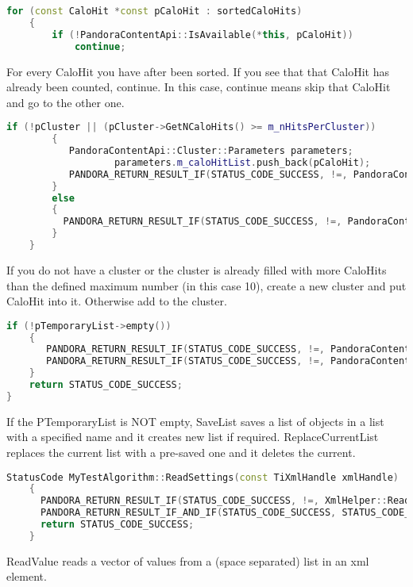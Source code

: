 \begin{lstlisting}[language=C++]
	for (const CaloHit *const pCaloHit : sortedCaloHits)
	{
		if (!PandoraContentApi::IsAvailable(*this, pCaloHit))
		    continue;
\end{lstlisting}
For every CaloHit you have after been sorted. If you see that that CaloHit has already been counted, continue. In this case, continue means skip that CaloHit and go to the other one.
\begin{lstlisting}[language=C++]
		if (!pCluster || (pCluster->GetNCaloHits() >= m_nHitsPerCluster))
		{
		   PandoraContentApi::Cluster::Parameters parameters;
                   parameters.m_caloHitList.push_back(pCaloHit);
		   PANDORA_RETURN_RESULT_IF(STATUS_CODE_SUCCESS, !=, PandoraContentApi::Cluster::Create(*this, parameters, pCluster));
		}
  		else
 		{
		  PANDORA_RETURN_RESULT_IF(STATUS_CODE_SUCCESS, !=, PandoraContentApi::AddToCluster(*this, pCluster, pCaloHit));
		}
	}
\end{lstlisting}
If you do not have a cluster or the cluster is already filled with more CaloHits than the defined maximum number (in this case 10), create a new cluster and put CaloHit into it. Otherwise add to the cluster.
\begin{lstlisting}[language=C++]
	if (!pTemporaryList->empty())
	{
	   PANDORA_RETURN_RESULT_IF(STATUS_CODE_SUCCESS, !=, PandoraContentApi::SaveList<Cluster>(*this, m_outputClusterListName));
	   PANDORA_RETURN_RESULT_IF(STATUS_CODE_SUCCESS, !=, PandoraContentApi::ReplaceCurrentList<Cluster>(*this, m_outputClusterListName));
	}
	return STATUS_CODE_SUCCESS;
}
\end{lstlisting}
If the PTemporaryList is NOT empty, SaveList saves a list of objects in a list with a specified name and it creates new list if required. ReplaceCurrentList replaces the current list with a pre-saved one and it deletes the current.

\begin{lstlisting}[language=C++]
StatusCode MyTestAlgorithm::ReadSettings(const TiXmlHandle xmlHandle)
	{
	  PANDORA_RETURN_RESULT_IF(STATUS_CODE_SUCCESS, !=, XmlHelper::ReadValue(xmlHandle, "OutputClusterListName", m_outputClusterListName));
	  PANDORA_RETURN_RESULT_IF_AND_IF(STATUS_CODE_SUCCESS, STATUS_CODE_NOT_FOUND, !=, XmlHelper::ReadValue(xmlHandle,"NHitsPerCluster", m_nHitsPerCluster));
	  return STATUS_CODE_SUCCESS;
	}
\end{lstlisting}

ReadValue reads a vector of values from a (space separated) list in an xml element.



